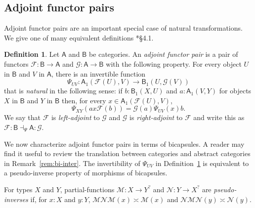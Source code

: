 \documentclass{amsart}
\newcommand{\tin}{:}
\newcommand{\Cat}[1]{\mathsf{#1}}
\newcommand{\cat}[1]{\Cat{#1}}
\numberwithin{lstfloat}{section}
\newcommand{\adjoint}{\dashv}
\newcommand{\func}[1]{\mathcal{#1}}
\newcommand{\fF}{\func{F}}
\newcommand{\fG}{\func{G}}
\newcommand{\fM}{\func{M}}
\newcommand{\fN}{\func{N}}
\newcommand{\cA}{\cat{A}}
\newcommand{\cB}{\cat{B}}
\theoremstyle{definition}
\newtheorem{defn}[thm]{Definition}
\theoremstyle{remark}
\numberwithin{equation}{section}
\begin{document}
\subsection{Adjoint functor pairs}
\label{sec:biacts-adjoints}
Adjoint functor pairs are an important 
special case of natural transformations. 
We give one of many equivalent definitions
\cite{Riehl}*{\S4.1}.
\begin{defn}\label{def:adjoint}
  Let $\cA$ and $\cB$ be categories. An \emph{adjoint functor pair} is
  a pair of functors $\fF:\cB\to\cA$ and $\fG : \cA  \to\cB$ with the 
  following property. For every object $U$ in $\cB$ and
  $V$ in $\cA$, there is an invertible function
  \[
    \Psi_{UV} : \cA_1(\fF(U),V) \to \cB_1(U, \fG(V))
  \]
  that is \emph{natural} in the following sense: if $b\tin\cB_1(X,U)$ and
  $a\tin \cA_1(V,Y)$ for objects $X$ in $\cB$ and $Y$ in
  $\cB$ then, for every $x\in \cA_1(\fF(U),V)$,
  \begin{equation}\label{def:adjoint-classic}
    \Psi_{XY}(a x \fF(b)) 
    = \fG(a)\Psi_{UV}(x)b . 
  \end{equation}
  We say that $\fF$ is \emph{left-adjoint} to $\fG$ and $\fG$ is
  \emph{right-adjoint} to $\func{F}$ and write this as $\fF : \cB
  \adjoint_{\Psi} \cA : \fG$.
\end{defn}

We now characterize adjoint functor pairs in terms of bicapsules.  
A reader may find it useful to review the translation between 
categories and abstract categories in Remark~\ref{rem:bi-inter}. The invertibility of $\Psi_{UV}$ in
Definition~\ref{def:adjoint} is equivalent to a pseudo-inverse property of
morphisms of bicapsules. 

For types $X$ and $Y$, partial-functions $\fM : X\to
Y^?$ and $\fN : Y\to X^?$ are \emph{pseudo-inverses} if,
for $x:X$ and $y:Y$,
$\fM\fN\fM(x)\asymp
\fM(x)$ and $\fN\fM\fN(y)\asymp \fN(y)$.
\end{document}
